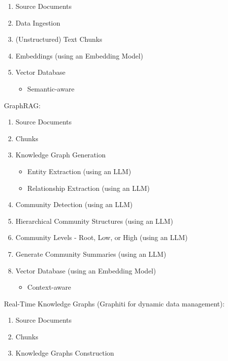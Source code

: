 \documentclass[
  british,
]{article}
\providecommand{\tightlist}{%
  \setlength{\itemsep}{0pt}\setlength{\parskip}{0pt}}
\begin{document}
\begin{enumerate}
\def\labelenumi{\arabic{enumi}.}
\setcounter{enumi}{-1}
\tightlist
\item
  Source Documents
\item
  Data Ingestion
\item
  (Unstructured) Text Chunks
\item
  Embeddings (using an Embedding Model)
\item
  Vector Database

  \begin{itemize}
  \tightlist
  \item
    Semantic-aware
  \end{itemize}
\end{enumerate}

GraphRAG:

\begin{enumerate}
\def\labelenumi{\arabic{enumi}.}
\setcounter{enumi}{-1}
\tightlist
\item
  Source Documents
\item
  Chunks
\item
  Knowledge Graph Generation

  \begin{itemize}
  \tightlist
  \item
    Entity Extraction (using an LLM)
  \item
    Relationship Extraction (using an LLM)
  \end{itemize}
\item
  Community Detection (using an LLM)
\item
  Hierarchical Community Structures (using an LLM)
\item
  Community Levels - Root, Low, or High (using an LLM)
\item
  Generate Community Summaries (using an LLM)
\item
  Vector Database (using an Embedding Model)

  \begin{itemize}
  \tightlist
  \item
    Context-aware
  \end{itemize}
\end{enumerate}

Real-Time Knowledge Graphs (Graphiti for dynamic data management):

\begin{enumerate}
\def\labelenumi{\arabic{enumi}.}
\setcounter{enumi}{-1}
\tightlist
\item
  Source Documents
\item
  Chunks
\item
  Knowledge Graphs Construction
\end{enumerate}
\end{document}
